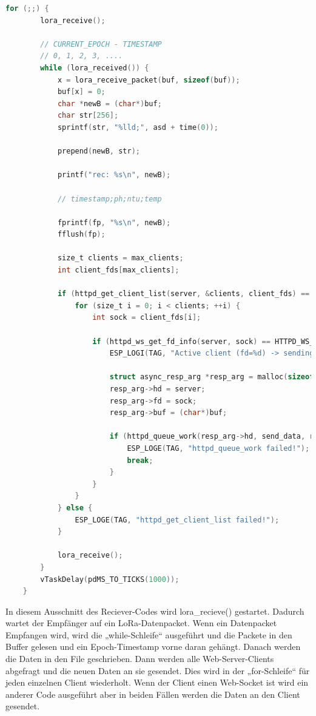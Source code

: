 \begin{lstlisting}[language=C, caption={Reciever sendet von LoRa erhaltene Daten an Clients}, label={lst:Reciever}]
  for (;;) {
        lora_receive();

        // CURRENT_EPOCH - TIMESTAMP
        // 0, 1, 2, 3, ....
        while (lora_received()) {
            x = lora_receive_packet(buf, sizeof(buf));
            buf[x] = 0;
            char *newB = (char*)buf;
            char str[256];
            sprintf(str, "%lld;", asd + time(0));

            prepend(newB, str);

            printf("rec: %s\n", newB);

            // timestamp;ph;ntu;temp

            fprintf(fp, "%s\n", newB);
            fflush(fp);

            size_t clients = max_clients;
            int client_fds[max_clients];
            
            if (httpd_get_client_list(server, &clients, client_fds) == ESP_OK) {
                for (size_t i = 0; i < clients; ++i) {
                    int sock = client_fds[i];

                    if (httpd_ws_get_fd_info(server, sock) == HTTPD_WS_CLIENT_WEBSOCKET) {
                        ESP_LOGI(TAG, "Active client (fd=%d) -> sending async message", sock);
                        
                        struct async_resp_arg *resp_arg = malloc(sizeof(struct async_resp_arg));
                        resp_arg->hd = server;
                        resp_arg->fd = sock;
                        resp_arg->buf = (char*)buf;
                        
                        if (httpd_queue_work(resp_arg->hd, send_data, resp_arg) != ESP_OK) {
                            ESP_LOGE(TAG, "httpd_queue_work failed!");
                            break;
                        }
                    }
                }
            } else {
                ESP_LOGE(TAG, "httpd_get_client_list failed!");
            }

            lora_receive();
        }
        vTaskDelay(pdMS_TO_TICKS(1000));
    }
\end{lstlisting}
In diesem Ausschnitt des Reciever-Codes wird lora\_recieve() gestartet. 
Dadurch wartet der Empfänger auf ein LoRa-Datenpacket. 
Wenn ein Datenpacket Empfangen wird, wird die „while-Schleife“ ausgeführt und die Packete in den Buffer gelesen und ein Epoch-Timestamp vorne daran gehängt. Danach werden die Daten in den File geschrieben. Dann werden alle Web-Server-Clients abgefragt und die neuen Daten an sie gesendet. Dies wird in der „for-Schleife“ für jeden einzelnen Client wiederholt. Wenn der Client einen Web-Socket ist wird ein anderer Code ausgeführt aber in beiden Fällen werden die Daten an den Client gesendet.

